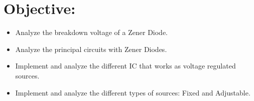 \section{Objective:}

\begin{itemize}
\item Analyze the breakdown voltage of a Zener Diode.
\item Analyze the principal circuits with Zener Diodes.
\item Implement and analyze the different IC that works as voltage regulated sources.
\item Implement and analyze the different types of sources: Fixed and Adjustable.
\end{itemize}
\pagebreak